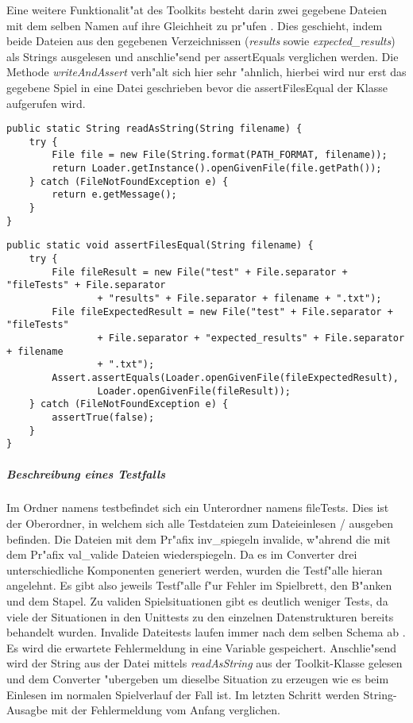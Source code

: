 Eine weitere Funktionalit"at des Toolkits besteht darin zwei gegebene Dateien mit dem selben Namen auf ihre Gleichheit zu pr"ufen . Dies geschieht, indem beide Dateien aus den gegebenen Verzeichnissen (\emph{results} sowie \emph{expected\_results}) als Strings ausgelesen und anschlie"send per assertEquals verglichen werden. Die Methode \emph{writeAndAssert} verh"alt sich hier sehr "ahnlich, hierbei wird nur erst das gegebene Spiel in eine Datei geschrieben bevor die assertFilesEqual der Klasse aufgerufen wird. 
\begin{lstlisting}[float,style=CodeHighlighting,caption=TestToolkit - readAsString,label=lst:testToolkit_readAsString]
public static String readAsString(String filename) {
    try {
        File file = new File(String.format(PATH_FORMAT, filename));
        return Loader.getInstance().openGivenFile(file.getPath());
    } catch (FileNotFoundException e) {
        return e.getMessage();
    }
}
\end{lstlisting}
\begin{lstlisting}[float,style=CodeHighlighting,caption=TestToolkit - assertFilesEqual,label=lst:testToolkit_assertFilesEqual]
public static void assertFilesEqual(String filename) {
    try {
        File fileResult = new File("test" + File.separator + "fileTests" + File.separator
                + "results" + File.separator + filename + ".txt");
        File fileExpectedResult = new File("test" + File.separator + "fileTests" 
        		+ File.separator + "expected_results" + File.separator + filename 
        		+ ".txt");
        Assert.assertEquals(Loader.openGivenFile(fileExpectedResult), 
        		Loader.openGivenFile(fileResult));
    } catch (FileNotFoundException e) {
        assertTrue(false);
    }
}
\end{lstlisting}

\subparagraph{Beschreibung eines Testfalls}
Im Ordner namens \glqq test\grqq befindet sich ein Unterordner namens \glqq fileTests\grqq . Dies ist der Oberordner, in welchem sich alle Testdateien zum Dateieinlesen / ausgeben befinden. Die Dateien mit dem Pr"afix \glqq inv\_\grqq spiegeln invalide, w"ahrend die mit dem Pr"afix \glqq val\_\grqq valide Dateien wiederspiegeln. Da es im Converter drei unterschiedliche Komponenten generiert werden, wurden die Testf"alle hieran angelehnt. Es gibt also jeweils Testf"alle f"ur Fehler im Spielbrett, den B"anken und dem Stapel. Zu validen Spielsituationen gibt es deutlich weniger Tests, da viele der Situationen in den Unittests zu den einzelnen Datenstrukturen bereits behandelt wurden. Invalide Dateitests laufen immer nach dem selben Schema ab . Es wird die erwartete Fehlermeldung in eine Variable gespeichert. Anschlie"send wird der String aus der Datei mittels \emph{readAsString} aus der Toolkit-Klasse gelesen und dem Converter "ubergeben um dieselbe Situation zu erzeugen wie es beim Einlesen im normalen Spielverlauf der Fall ist. Im letzten Schritt werden String-Ausagbe mit der Fehlermeldung vom Anfang verglichen. 

